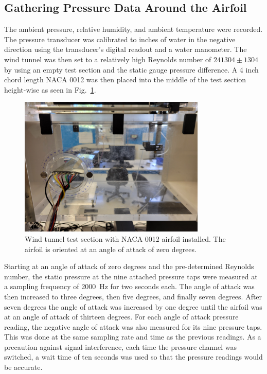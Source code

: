 \documentclass[journal,letterpaper]{IEEEtran}
\begin{document}
\subsection{Gathering Pressure Data Around the Airfoil}

The ambient pressure, relative humidity, and ambient temperature were recorded.
The pressure transducer was calibrated to inches of water in the negative direction using the transducer's digital readout and a water manometer.
The wind tunnel was then set to a relatively high Reynolds number of $241304 \pm 1304$ by using an empty test section and the static gauge pressure difference.
A 4 inch chord length NACA 0012 was then placed into the middle of the test section height-wise as seen in Fig.~\ref{fig:section}.

\begin{figure}[H]
    \centering
    \includegraphics[width=3.5in]{testSection}
    \caption{Wind tunnel test section with NACA 0012 airfoil installed. The airfoil is oriented at an angle of attack of zero degrees.}
    \label{fig:section}
\end{figure}

Starting at an angle of attack of zero degrees and the pre-determined Reynolds number, the static pressure at the nine attached pressure taps were measured at a sampling frequency of \qty{2000}{\Hz} for two seconds each.
The angle of attack was then increased to three degrees, then five degrees, and finally seven degrees.
After seven degrees the angle of attack was increased by one degree until the airfoil was at an angle of attack of thirteen degrees.
For each angle of attack pressure reading, the negative angle of attack was also measured for its nine pressure taps.
This was done at the same sampling rate and time as the previous readings.
As a precaution against signal interference, each time the pressure channel was switched, a wait time of ten seconds was used so that the pressure readings would be accurate.
\end{document}
